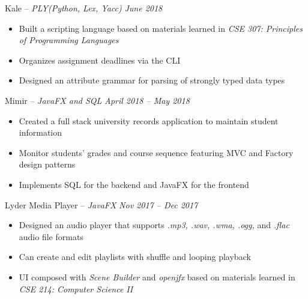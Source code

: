 \documentclass[11pt,letterpaper]{article}
\begin{document}
\spacedhrule{0em}{-0.9em} 



\headedsection 
{Kale -- \textit{PLY(Python, Lex, Yacc)}}
{\textit{June 2018}} {
		\begin{itemize}[noitemsep,nolistsep]
	\item Built a scripting language based on materials learned in \textit{CSE 307: Principles of Programming Languages}
	\item Organizes assignment deadlines via the CLI
	\item Designed an attribute grammar for parsing of strongly typed data types
\end{itemize}
}


\headedsection 
{Mimir -- \textit{JavaFX and SQL}}
{\textit{April 2018 -- May 2018}} {
\begin{itemize}[noitemsep,nolistsep]
	\item Created a full stack university records application to maintain student information
	\item Monitor students' grades and course sequence featuring MVC and Factory design patterns
	\item Implements SQL for the backend and JavaFX for the frontend
\end{itemize}
}


\headedsection 
{Lyder Media Player -- \textit{JavaFX}}
{\textit{Nov 2017 -- Dec 2017}} {
\begin{itemize}[noitemsep,nolistsep]
	\item Designed an audio player that supports \textit{.mp3, .wav, .wma, .ogg,} and \textit{.flac}  audio file formats
	\item Can create and edit playlists with shuffle and looping playback
	\item UI composed with \textit{Scene Builder} and \textit{openjfx} based on materials learned in \textit{CSE 214: Computer Science II}
\end{itemize}
}

\end{document}

